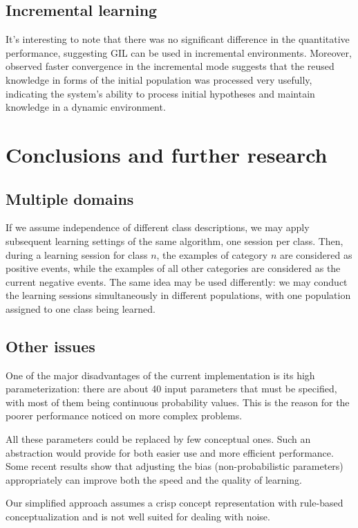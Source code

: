\documentclass[12pt]{book}
\begin{document}
\subsection{Incremental learning}
It's interesting to note that there was no significant difference in the quantitative performance, suggesting GIL can be used in incremental environments. Moreover, observed faster convergence in the incremental mode suggests that the reused knowledge in forms of the initial population was processed very usefully, indicating the system's ability to process initial hypotheses and maintain knowledge in a dynamic environment.

\section{Conclusions and further research}
\subsection{Multiple domains}
If we assume independence of different class descriptions, we may apply subsequent learning settings of the same algorithm, one session per class. Then, during a learning session for class $n$, the examples of category $n$ are considered as positive events, while the examples of all other categories are considered as the current negative events. The same idea may be used differently: we may conduct the learning sessions simultaneously in different populations, with one population assigned to one class being learned.

\subsection{Other issues}
One of the major disadvantages of the current implementation is its high parameterization: there are about 40 input parameters that must be specified, with most of them being continuous probability values. This is the reason for the poorer performance noticed on more complex problems.

All these parameters could be replaced by few conceptual ones. Such an abstraction would provide for both easier use and more efficient performance. Some recent results show that adjusting the bias (non-probabilistic parameters) appropriately can improve both the speed and the quality of learning.

Our simplified approach assumes a crisp concept representation with rule-based conceptualization and is not well suited for dealing with noise.
\clearpage
\end{document}
